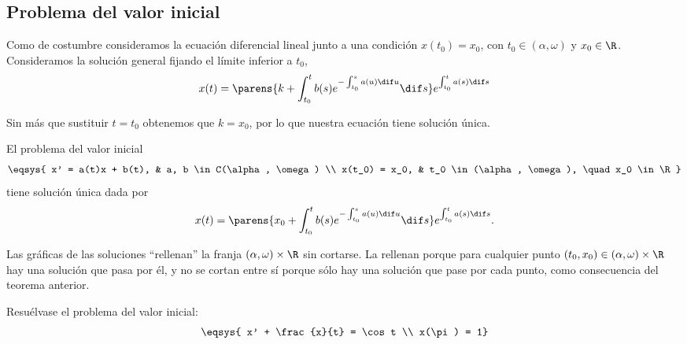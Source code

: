 \documentclass[../ecuaciones_diferenciales.tex]{subfiles}
\begin{document}
\subsection{Problema del valor inicial}

Como de costumbre consideramos la ecuación diferencial lineal junto a una
condición \(x(t_0) = x_0\), con \(t_0 \in (\alpha, \omega)\) y \(x_0 \in \R\).
Consideramos la solución general fijando el límite inferior a \(t_0\),
\[x(t) = \parens{k + \int_{t_0}^t b(s) e^{-\int_{t_0}^s a(u) \dif u} \dif s}
	e^{\int_{t_0}^t a(s) \dif s}\]

Sin más que sustituir \(t = t_0\) obtenemos que \(k = x_0\), por lo que
nuestra ecuación tiene solución única.

\begin{theorem}
	El problema del valor inicial
	\[\eqsys{
			x' = a(t)x + b(t), & a, b \in C(\alpha, \omega) \\
			x(t_0) = x_0, 	  & t_0 \in (\alpha, \omega), \quad x_0 \in \R}\]
	tiene solución única dada por
	\[x(t) =
		\parens{x_0 + \int_{t_0}^t b(s) e^{-\int_{t_0}^s a(u) \dif u} \dif s}
		e^{\int_{t_0}^t a(s) \dif s}.\]
\end{theorem}

Las gráficas de las soluciones ``rellenan'' la franja
\((\alpha, \omega) \times \R\) sin cortarse. La rellenan porque para cualquier
punto \((t_0, x_0) \in (\alpha, \omega) \times \R\) hay una solución que pasa
por él, y no se cortan entre sí porque sólo hay una solución que pase por cada
punto, como consecuencia del teorema anterior.

\begin{example}
	Resuélvase el problema del valor inicial:
	\[\eqsys{
			x' + \frac{x}{t} = \cos t \\
			x(\pi) = 1}\]
\end{example}
\end{document}
